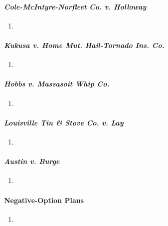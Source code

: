\paragraph{\emph{Cole-McIntyre-Norfleet Co. v. Holloway}}

\begin{enumerate}
    \item %
\end{enumerate}

\paragraph{\emph{Kukusa v. Home Mut. Hail-Tornado Ins. Co.}}

\begin{enumerate}
    \item %
\end{enumerate}

\paragraph{\emph{Hobbs v. Massasoit Whip Co.}}

\begin{enumerate}
    \item %
\end{enumerate}

\paragraph{\emph{Louisville Tin \& Stove Co. v. Lay}}

\begin{enumerate}
    \item %
\end{enumerate}

\paragraph{\emph{Austin v. Burge}}

\begin{enumerate}
    \item %
\end{enumerate}

\paragraph{Negative-Option Plans}

\begin{enumerate}
    \item %
\end{enumerate}

